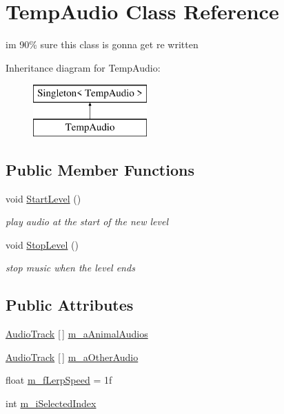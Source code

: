 \hypertarget{class_temp_audio}{}\section{Temp\+Audio Class Reference}
\label{class_temp_audio}


im 90\% sure this class is gonna get re written  


Inheritance diagram for Temp\+Audio\+:\begin{figure}[H]
\begin{center}
\leavevmode
\includegraphics[height=2.000000cm]{class_temp_audio}
\end{center}
\end{figure}
\subsection*{Public Member Functions}
\begin{DoxyCompactItemize}
\item 
void \mbox{\hyperlink{class_temp_audio_a83795f0b3f58474686c4ba134e485514}{Start\+Level}} ()
\begin{DoxyCompactList}\small\item\em play audio at the start of the new level \end{DoxyCompactList}\item 
void \mbox{\hyperlink{class_temp_audio_ac57e919c76d84e8fbd11ecbaed14d63d}{Stop\+Level}} ()
\begin{DoxyCompactList}\small\item\em stop music when the level ends \end{DoxyCompactList}\end{DoxyCompactItemize}
\subsection*{Public Attributes}
\begin{DoxyCompactItemize}
\item 
\mbox{\hyperlink{struct_audio_track}{Audio\+Track}} \mbox{[}$\,$\mbox{]} \mbox{\hyperlink{class_temp_audio_a81b8a91e44ec86c4a1263fd53e8b7c83}{m\+\_\+a\+Animal\+Audios}}
\item 
\mbox{\hyperlink{struct_audio_track}{Audio\+Track}} \mbox{[}$\,$\mbox{]} \mbox{\hyperlink{class_temp_audio_a5bcc844ea3300f7cae93d2692ab2cde9}{m\+\_\+a\+Other\+Audio}}
\item 
float \mbox{\hyperlink{class_temp_audio_ac0b9a02bf1193b80dc5a957edd397180}{m\+\_\+f\+Lerp\+Speed}} = 1f
\item 
int \mbox{\hyperlink{class_temp_audio_afc0b97092fcd9e36e2c24347ed9ba96a}{m\+\_\+i\+Selected\+Index}}
\end{DoxyCompactItemize}
